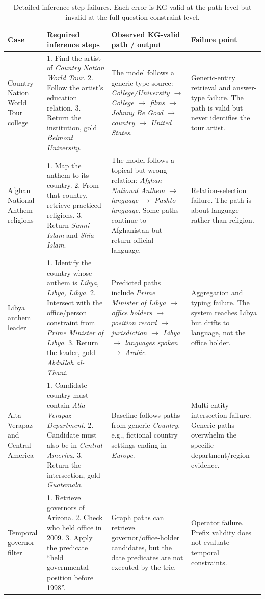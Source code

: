 \documentclass[10pt,twocolumn]{article}
\begin{document}
\begin{table}[t]
\centering
\small
\begin{tabular}{p{}p{}p{}p{}}
\toprule
Case & Required inference steps & Observed KG-valid path / output & Failure point \\
\midrule
Country Nation World Tour college &
1. Find the artist of \emph{Country Nation World Tour}. 2. Follow the artist's education relation. 3. Return the institution, gold \emph{Belmont University}. &
The model follows a generic type source: \emph{College/University $\rightarrow$ College $\rightarrow$ films $\rightarrow$ Johnny Be Good $\rightarrow$ country $\rightarrow$ United States}. &
Generic-entity retrieval and answer-type failure. The path is valid but never identifies the tour artist. \\
\midrule
Afghan National Anthem religions &
1. Map the anthem to its country. 2. From that country, retrieve practiced religions. 3. Return \emph{Sunni Islam} and \emph{Shia Islam}. &
The model follows a topical but wrong relation: \emph{Afghan National Anthem $\rightarrow$ language $\rightarrow$ Pashto language}. Some paths continue to Afghanistan but return official language. &
Relation-selection failure. The path is about language rather than religion. \\
\midrule
Libya anthem leader &
1. Identify the country whose anthem is \emph{Libya, Libya, Libya}. 2. Intersect with the office/person constraint from \emph{Prime Minister of Libya}. 3. Return the leader, gold \emph{Abdullah al-Thani}. &
Predicted paths include \emph{Prime Minister of Libya $\rightarrow$ office holders $\rightarrow$ position record $\rightarrow$ jurisdiction $\rightarrow$ Libya $\rightarrow$ languages spoken $\rightarrow$ Arabic}. &
Aggregation and typing failure. The system reaches Libya but drifts to language, not the office holder. \\
\midrule
Alta Verapaz and Central America &
1. Candidate country must contain \emph{Alta Verapaz Department}. 2. Candidate must also be in \emph{Central America}. 3. Return the intersection, gold \emph{Guatemala}. &
Baseline follows paths from generic \emph{Country}, e.g., fictional country settings ending in \emph{Europe}. &
Multi-entity intersection failure. Generic paths overwhelm the specific department/region evidence. \\
\midrule
Temporal governor filter &
1. Retrieve governors of Arizona. 2. Check who held office in 2009. 3. Apply the predicate ``held governmental position before 1998''. &
Graph paths can retrieve governor/office-holder candidates, but the date predicates are not executed by the trie. &
Operator failure. Prefix validity does not evaluate temporal constraints. \\
\bottomrule
\end{tabular}
\caption{Detailed inference-step failures. Each error is KG-valid at the path level but invalid at the full-question constraint level.}
\label{tab:failure-steps}
\end{table}
\end{document}
